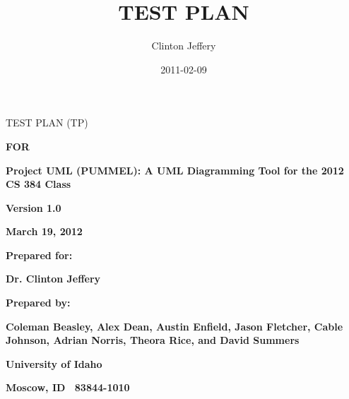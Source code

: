 \documentclass[twoside,letterpaper]{article}
\title{TEST PLAN}
\author{Clinton Jeffery}
\date{2011-02-09}
\begin{document}
{\centering TEST PLAN (TP)}

{\centering{}\bfseries\color{black}
FOR
\par}


\bigskip

{\centering{}\bfseries\color{black}
Project UML (PUMMEL): A UML Diagramming Tool for the 2012 CS 384 Class
\par}


\bigskip


\bigskip


\bigskip

\begin{figure}
\centering
\end{figure}

\bigskip


\bigskip


\bigskip


\bigskip

{\centering{}\bfseries\color{black}
Version 1.0
\par}

{\centering{}\bfseries\color{black}
March 19, 2012
\par}


\bigskip


\bigskip

{\centering{}\bfseries\color{black}
Prepared for:
\par}

{\centering{}\bfseries\color{black}
Dr. Clinton Jeffery
\par}


\bigskip


\bigskip

{\centering{}\bfseries\color{black}
Prepared by:
\par}

{\centering{}\bfseries\color{black}
Coleman Beasley, Alex Dean, Austin Enfield, Jason Fletcher, Cable Johnson, Adrian Norris, Theora Rice, and David Summers 
\par}

{\centering{}\bfseries\color{black}
University of Idaho
\par}

{\centering{}\bfseries\color{black}
Moscow, ID \ 83844-1010
\par}
\end{document}
